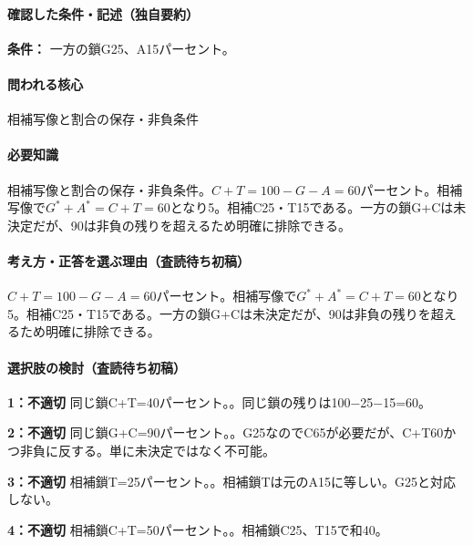 \paragraph{確認した条件・記述（独自要約）}\mbox{}\par

\noindent\textbf{条件：} 一方の鎖G25、A15パーセント。\par

\paragraph{問われる核心} 相補写像と割合の保存・非負条件

\paragraph{必要知識} 相補写像と割合の保存・非負条件。\(C+T=100-G-A=60\)パーセント。相補写像で\(G^{\ast}+A^{\ast}=C+T=60\)となり5。相補C25・T15である。一方の鎖G+Cは未決定だが、90は非負の残りを超えるため明確に排除できる。

\paragraph{考え方・正答を選ぶ理由（査読待ち初稿）} \(C+T=100-G-A=60\)パーセント。相補写像で\(G^{\ast}+A^{\ast}=C+T=60\)となり5。相補C25・T15である。一方の鎖G+Cは未決定だが、90は非負の残りを超えるため明確に排除できる。

\paragraph{選択肢の検討（査読待ち初稿）}\mbox{}\par

\noindent\textbf{1：不適切} 同じ鎖C+T=\allowbreak{}40パーセント。。同じ鎖の残りは100−25−15=\allowbreak{}60。\par

\noindent\textbf{2：不適切} 同じ鎖G+C=\allowbreak{}90パーセント。。G25なのでC65が必要だが、C+T60かつ非負に反する。単に未決定ではなく不可能。\par

\noindent\textbf{3：不適切} 相補鎖T=\allowbreak{}25パーセント。。相補鎖Tは元のA15に等しい。G25と対応しない。\par

\noindent\textbf{4：不適切} 相補鎖C+T=\allowbreak{}50パーセント。。相補鎖C25、T15で和40。\par

